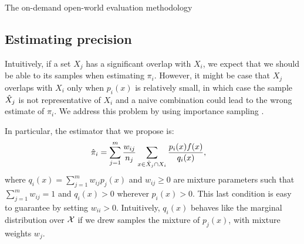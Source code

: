 \begin{algorithm}
  \caption{\label{alg:on-demand-sampling} The on-demand open-world evaluation methodology}
\begin{algorithmic}


  \ENDFOR{}
  \ENDFOR{}
\end{algorithmic}
\end{algorithm}

\subsection{Estimating precision}

Intuitively, if a set $X_j$ has a significant overlap with $X_i$, we expect that we should be able to its samples when estimating $\pi_i$.
However, it might be case that $X_j$ overlaps with $X_i$ only when $p_i(x)$ is relatively small, in which case the sample ${\hat{X}}_j$ is not representative of $X_i$ and a naive combination could lead to the wrong estimate of $\pi_i$.
We address this problem by using importance sampling \citep{owen2013monte}.

In particular, the estimator that we propose is:
\begin{align*}
  {\hat{\pi}}_i &= \sum_{j=1}^m \frac{w_{ij}}{n_{j}} \sum_{x \in {\hat{X}}_j \cap X_i} \frac{p_i(x) f(x)}{q_i(x)},
\end{align*}
where $q_i(x) = \sum_{j=1}^m w_{ij} p_j(x)$ and $w_{ij} \ge 0$ are mixture parameters such that $\sum_{j=1}^m w_{ij} = 1$ and $q_i(x) > 0$ wherever $p_i(x) > 0$.
This last condition is easy to guarantee by setting $w_{ii} > 0$.
Intuitively, $q_i(x)$ behaves like the marginal distribution over $\mathcal{X}$ if we drew samples the mixture of $p_j(x)$, with mixture weights $w_j$.

